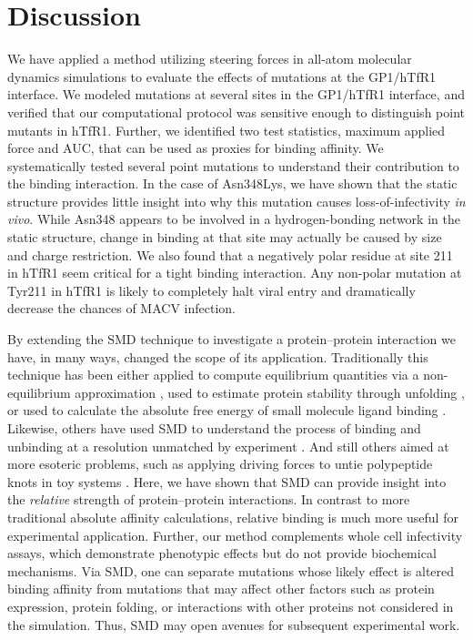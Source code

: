 \documentclass[journal=jacsat,manuscript=article]{achemso}
\begin{document}
\section{Discussion}

We have applied a method utilizing steering forces in all-atom molecular dynamics simulations to evaluate the effects of mutations at the GP1/hTfR1 interface. We modeled mutations at several sites in the GP1/hTfR1 interface, and verified that our computational protocol was sensitive enough to distinguish point mutants in hTfR1. Further, we identified two test statistics, maximum applied force and AUC, that can be used as proxies for binding affinity. We systematically tested several point mutations to understand their contribution to the binding interaction. In the case of Asn348Lys, we have shown that the static structure provides little insight into why this mutation causes loss-of-infectivity \textit{in vivo}. While Asn348 appears to be involved in a hydrogen-bonding network in the static structure, change in binding at that site may actually be caused by size and charge restriction. We also found that a negatively polar residue at site 211 in hTfR1 seem critical for a tight binding interaction. Any non-polar mutation at Tyr211 in hTfR1 is likely to completely halt viral entry and dramatically decrease the chances of MACV infection.

By extending the SMD technique to investigate a protein--protein interaction we have, in many ways, changed the scope of its application. Traditionally this technique has been either applied to compute equilibrium quantities via a non-equilibrium approximation \cite{Park2003,Park2004,Giorgino2011}, used to estimate protein stability through unfolding \cite{Lu1999}, or used to calculate the absolute free energy of small molecule ligand binding \cite{Dixit2001}. Likewise, others have used SMD to understand the process of binding and unbinding at a resolution unmatched by experiment \cite{Cuendet2011,Giorgino2011}. And still others aimed at more esoteric problems, such as applying driving forces to untie polypeptide knots in toy systems \cite{Sulkowska2010}. Here, we have shown that SMD can provide insight into the \textit{relative} strength of protein--protein interactions. In contrast to more traditional absolute affinity calculations, relative binding is much more useful for experimental application. Further, our method complements whole cell infectivity assays, which demonstrate phenotypic effects but do not provide biochemical mechanisms. Via SMD, one can separate mutations whose likely effect is altered binding affinity from mutations that may affect other factors such as protein expression, protein folding, or interactions with other proteins not considered in the simulation. Thus, SMD may open avenues for subsequent experimental work.
\end{document}
